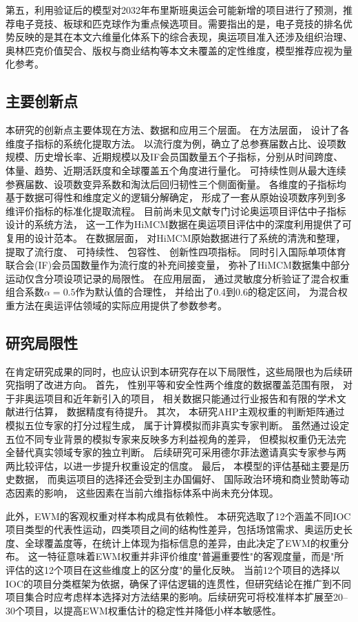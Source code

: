 \documentclass[twoside]{CUGThesis}
\begin{document}
第五，利用验证后的模型对2032年布里斯班奥运会可能新增的项目进行了预测，推荐电子竞技、板球和匹克球作为重点候选项目。需要指出的是，电子竞技的排名优势反映的是其在本文六维量化体系下的综合表现，奥运项目准入还涉及组织治理、奥林匹克价值契合、版权与商业结构等本文未覆盖的定性维度，模型推荐应视为量化参考。

\subsection{主要创新点}

本研究的创新点主要体现在方法、数据和应用三个层面。
在方法层面，
设计了各维度子指标的系统化提取方法。
以流行度为例，确立了总参赛届数占比、设项数规模、历史增长率、近期规模以及IF会员国数量五个子指标，分别从时间跨度、体量、趋势、近期活跃度和全球覆盖五个角度进行量化。
可持续性则从最大连续参赛届数、设项数变异系数和淘汰后回归韧性三个侧面衡量。
各维度的子指标均基于数据可得性和维度定义的逻辑分解确定，
形成了一套从原始设项数序列到多维评价指标的标准化提取流程。
目前尚未见文献专门讨论奥运项目评估中子指标设计的系统方法，
这一工作为HiMCM数据在奥运项目评估中的深度利用提供了可复用的设计范本。
在数据层面，
对HiMCM原始数据进行了系统的清洗和整理，
提取了流行度、
可持续性、
包容性、
创新性四项指标。
同时引入国际单项体育联合会(IF)会员国数量作为流行度的补充间接变量，
弥补了HiMCM数据集中部分运动仅含分项设项记录的局限性。
在应用层面，
通过灵敏度分析验证了混合权重组合系数$\alpha = 0.5$作为默认值的合理性，
并给出了0.4到0.6的稳定区间，
为混合权重方法在奥运评估领域的实际应用提供了参数参考。

\subsection{研究局限性}

在肯定研究成果的同时，也应认识到本研究存在以下局限性，这些局限也为后续研究指明了改进方向。
首先，
性别平等和安全性两个维度的数据覆盖范围有限，
对于非奥运项目和近年新引入的项目，
相关数据只能通过行业报告和有限的学术文献进行估算，
数据精度有待提升。
其次，
本研究AHP主观权重的判断矩阵通过模拟五位专家的打分过程生成，
属于计算模拟而非真实专家判断\cite{Zahedi1986,Carmone1997}。
虽然通过设定五位不同专业背景的模拟专家来反映多方利益视角的差异，
但模拟权重仍无法完全替代真实领域专家的独立判断。
后续研究可采用德尔菲法邀请真实专家参与两两比较评估，以进一步提升权重设定的信度。
最后，
本模型的评估基础主要是历史数据，
而奥运项目的选择还会受到主办国偏好、
国际政治环境和商业赞助等动态因素的影响，
这些因素在当前六维指标体系中尚未充分体现。

此外，EWM的客观权重对样本构成具有依赖性。
本研究选取了12个涵盖不同IOC项目类型的代表性运动，四类项目之间的结构性差异，包括场馆需求、奥运历史长度、全球覆盖度等，在统计上体现为指标信息的差异，由此决定了EWM的权重分布。
这一特征意味着EWM权重并非评价维度"普遍重要性"的客观度量，而是"所评估的这12个项目在这些维度上的区分度"的量化反映。
当前12个项目的选择以IOC的项目分类框架为依据，确保了评估逻辑的连贯性，但研究结论在推广到不同项目集合时应考虑样本选择对方法结果的影响。后续研究可将校准样本扩展至20--30个项目，以提高EWM权重估计的稳定性并降低小样本敏感性。
\end{document}
